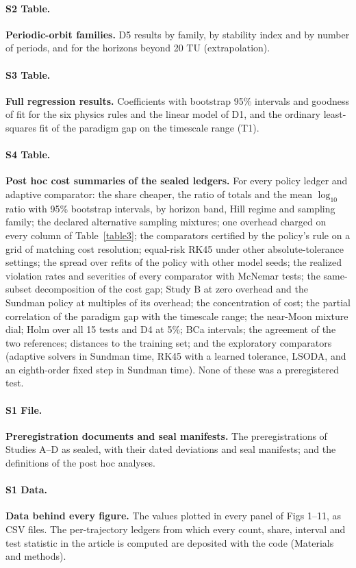 \documentclass[10pt,letterpaper]{article}
\begin{document}
\paragraph*{S2 Table.}
\label{S2_Table}
{\bf Periodic-orbit families.} D5 results by family, by stability index and by number of periods, and for the horizons beyond 20 TU (extrapolation).

\paragraph*{S3 Table.}
\label{S3_Table}
{\bf Full regression results.} Coefficients with bootstrap 95\% intervals and goodness of fit for the six physics rules and the linear model of D1, and the ordinary least-squares fit of the paradigm gap on the timescale range (T1).

\paragraph*{S4 Table.}
\label{S4_Table}
{\bf Post hoc cost summaries of the sealed ledgers.} For every policy ledger and adaptive comparator: the share cheaper, the ratio of totals and the mean $\log_{10}$ ratio with 95\% bootstrap intervals, by horizon band, Hill regime and sampling family; the declared alternative sampling mixtures; one overhead charged on every column of Table~\ref{table3}; the comparators certified by the policy's rule on a grid of matching cost resolution; equal-risk RK45 under other absolute-tolerance settings; the spread over refits of the policy with other model seeds; the realized violation rates and severities of every comparator with McNemar tests; the same-subset decomposition of the cost gap; Study B at zero overhead and the Sundman policy at multiples of its overhead; the concentration of cost; the partial correlation of the paradigm gap with the timescale range; the near-Moon mixture dial; Holm over all 15 tests and D4 at 5\%; BCa intervals; the agreement of the two references; distances to the training set; and the exploratory comparators (adaptive solvers in Sundman time, RK45 with a learned tolerance, LSODA, and an eighth-order fixed step in Sundman time). None of these was a preregistered test.

\paragraph*{S1 File.}
\label{S1_File}
{\bf Preregistration documents and seal manifests.} The preregistrations of Studies A--D as sealed, with their dated deviations and seal manifests; and the definitions of the post hoc analyses.

\paragraph*{S1 Data.}
\label{S1_Data}
{\bf Data behind every figure.} The values plotted in every panel of Figs 1--11, as CSV files. The per-trajectory ledgers from which every count, share, interval and test statistic in the article is computed are deposited with the code (Materials and methods).
\end{document}
